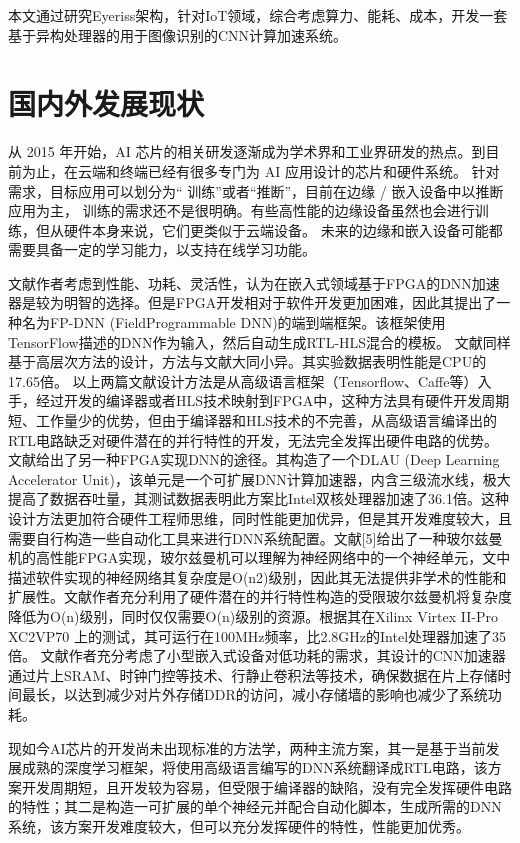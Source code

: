     本文通过研究Eyeriss架构，针对IoT领域，综合考虑算力、能耗、成本，开发一套基于异构处理器的用于图像识别的CNN计算加速系统。

\section{国内外发展现状}
    从 2015 年开始，AI 芯片的相关研发逐渐成为学术界和工业界研发的热点。到目前为止，在云端和终端已经有很多专门为 AI 应用设计的芯片和硬件系统。
    针对需求，目标应用可以划分为“ 训练”或者“推断”，目前在边缘 / 嵌入设备中以推断应用为主，
    训练的需求还不是很明确。有些高性能的边缘设备虽然也会进行训练，但从硬件本身来说，它们更类似于云端设备。
    未来的边缘和嵌入设备可能都需要具备一定的学习能力，以支持在线学习功能。

    文献\cite{liu2015fpga}作者考虑到性能、功耗、灵活性，认为在嵌入式领域基于FPGA的DNN加速器是较为明智的选择。但是FPGA开发相对于软件开发更加困难，因此其提出了一种名为FP-DNN (FieldProgrammable DNN)的端到端框架。该框架使用TensorFlow描述的DNN作为输入，然后自动生成RTL-HLS混合的模板。
    文献\cite{zhang2018accdnn}同样基于高层次方法的设计，方法与文献\cite{liu2015fpga}大同小异。其实验数据表明性能是CPU的17.65倍。
    以上两篇文献设计方法是从高级语言框架（Tensorflow、Caffe等）入手，经过开发的编译器或者HLS技术映射到FPGA中，这种方法具有硬件开发周期短、工作量少的优势，但由于编译器和HLS技术的不完善，从高级语言编译出的RTL电路缺乏对硬件潜在的并行特性的开发，无法完全发挥出硬件电路的优势。
    文献\cite{wang2017dlau}给出了另一种FPGA实现DNN的途径。其构造了一个DLAU (Deep Learning Accelerator Unit)，该单元是一个可扩展DNN计算加速器，内含三级流水线，极大提高了数据吞吐量，其测试数据表明此方案比Intel双核处理器加速了36.1倍。这种设计方法更加符合硬件工程师思维，同时性能更加优异，但是其开发难度较大，且需要自行构造一些自动化工具来进行DNN系统配置。文献[5]给出了一种玻尔兹曼机的高性能FPGA实现，玻尔兹曼机可以理解为神经网络中的一个神经单元，文中描述软件实现的神经网络其复杂度是O(n2)级别，因此其无法提供非学术的性能和扩展性。文献作者充分利用了硬件潜在的并行特性构造的受限玻尔兹曼机将复杂度降低为O(n)级别，同时仅仅需要O(n)级别的资源。根据其在Xilinx Virtex II-Pro XC2VP70 上的测试，其可运行在100MHz频率，比2.8GHz的Intel处理器加速了35倍。
    文献\cite{chen2017eyeriss}作者充分考虑了小型嵌入式设备对低功耗的需求，其设计的CNN加速器通过片上SRAM、时钟门控等技术、行静止卷积法等技术，确保数据在片上存储时间最长，以达到减少对片外存储DDR的访问，减小存储墙的影响也减少了系统功耗。
    
    现如今AI芯片的开发尚未出现标准的方法学，两种主流方案，其一是基于当前发展成熟的深度学习框架，将使用高级语言编写的DNN系统翻译成RTL电路，该方案开发周期短，且开发较为容易，但受限于编译器的缺陷，没有完全发挥硬件电路的特性；其二是构造一可扩展的单个神经元并配合自动化脚本，生成所需的DNN系统，该方案开发难度较大，但可以充分发挥硬件的特性，性能更加优秀。

